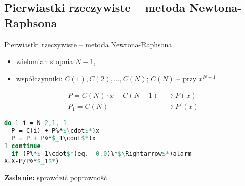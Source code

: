 \subsection{Pierwiastki rzeczywiste -- metoda Newtona-Raphsona}

\begin{frame}{Pierwiastki rzeczywiste -- metoda Newtona-Raphsona}
  \begin{itemize}
    \item wielomian stopnia $N-1$,
    \item współczynniki: $C(1), C(2), \dots, C(N)$; $C(N)$ -- przy $x^{N-1}$
  \end{itemize}

  $$\begin{array}{ll}
  P = C(N) \cdot x + C(N-1) & \rightarrow P(x) \\
  P_1 = C(N) & \rightarrow P'(x)
  \end{array}$$
\end{frame}

\begin{frame}[fragile]
  \begin{lstlisting}[language=Pascal]
do 1 i = N-2,1,-1
  P = C(i) + P%*$\cdot$*)x
  P = P + P%*$_1\cdot$*)x
1 continue
  if (P%*$_1\cdot$*)eq.  0.0)%*$\Rightarrow$*)alarm
X=X-P/P%*$_1$*)
\end{lstlisting}

  \textbf{Zadanie:} sprawdzić poprawność
\end{frame}
